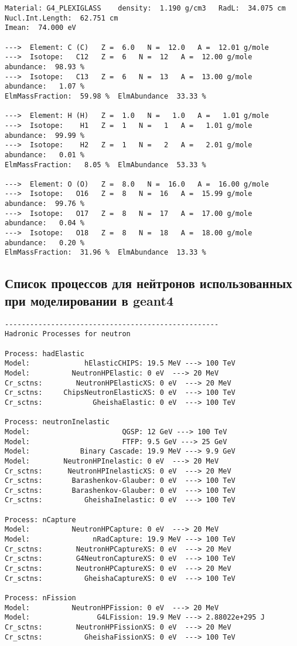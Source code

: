 {\begin{verbatim}
Material: G4_PLEXIGLASS    density:  1.190 g/cm3   RadL:  34.075 cm   Nucl.Int.Length:  62.751 cm 
Imean:  74.000 eV 

--->  Element: C (C)   Z =  6.0   N =  12.0   A =  12.01 g/mole
--->  Isotope:   C12   Z =  6   N =  12   A =  12.00 g/mole   abundance:  98.93 %
--->  Isotope:   C13   Z =  6   N =  13   A =  13.00 g/mole   abundance:   1.07 %
ElmMassFraction:  59.98 %  ElmAbundance  33.33 % 

--->  Element: H (H)   Z =  1.0   N =   1.0   A =   1.01 g/mole
--->  Isotope:    H1   Z =  1   N =   1   A =   1.01 g/mole   abundance:  99.99 %
--->  Isotope:    H2   Z =  1   N =   2   A =   2.01 g/mole   abundance:   0.01 %
ElmMassFraction:   8.05 %  ElmAbundance  53.33 % 

--->  Element: O (O)   Z =  8.0   N =  16.0   A =  16.00 g/mole
--->  Isotope:   O16   Z =  8   N =  16   A =  15.99 g/mole   abundance:  99.76 %
--->  Isotope:   O17   Z =  8   N =  17   A =  17.00 g/mole   abundance:   0.04 %
--->  Isotope:   O18   Z =  8   N =  18   A =  18.00 g/mole   abundance:   0.20 %
ElmMassFraction:  31.96 %  ElmAbundance  13.33 % 
\end{verbatim}
}
\subsection{Список процессов для нейтронов использованных при моделировании в geant4}

\label{list:geantNeuproc}
\tiny{
	\begin{verbatim}
---------------------------------------------------
Hadronic Processes for neutron

Process: hadElastic
Model:             hElasticCHIPS: 19.5 MeV ---> 100 TeV
Model:          NeutronHPElastic: 0 eV  ---> 20 MeV
Cr_sctns:        NeutronHPElasticXS: 0 eV  ---> 20 MeV
Cr_sctns:     ChipsNeutronElasticXS: 0 eV  ---> 100 TeV
Cr_sctns:            GheishaElastic: 0 eV  ---> 100 TeV

Process: neutronInelastic
Model:                      QGSP: 12 GeV ---> 100 TeV
Model:                      FTFP: 9.5 GeV ---> 25 GeV
Model:            Binary Cascade: 19.9 MeV ---> 9.9 GeV
Model:        NeutronHPInelastic: 0 eV  ---> 20 MeV
Cr_sctns:      NeutronHPInelasticXS: 0 eV  ---> 20 MeV
Cr_sctns:       Barashenkov-Glauber: 0 eV  ---> 100 TeV
Cr_sctns:       Barashenkov-Glauber: 0 eV  ---> 100 TeV
Cr_sctns:          GheishaInelastic: 0 eV  ---> 100 TeV

Process: nCapture
Model:          NeutronHPCapture: 0 eV  ---> 20 MeV
Model:               nRadCapture: 19.9 MeV ---> 100 TeV
Cr_sctns:        NeutronHPCaptureXS: 0 eV  ---> 20 MeV
Cr_sctns:        G4NeutronCaptureXS: 0 eV  ---> 100 TeV
Cr_sctns:        NeutronHPCaptureXS: 0 eV  ---> 20 MeV
Cr_sctns:          GheishaCaptureXS: 0 eV  ---> 100 TeV

Process: nFission
Model:          NeutronHPFission: 0 eV  ---> 20 MeV
Model:                G4LFission: 19.9 MeV ---> 2.88022e+295 J  
Cr_sctns:        NeutronHPFissionXS: 0 eV  ---> 20 MeV
Cr_sctns:          GheishaFissionXS: 0 eV  ---> 100 TeV
\end{verbatim}
}